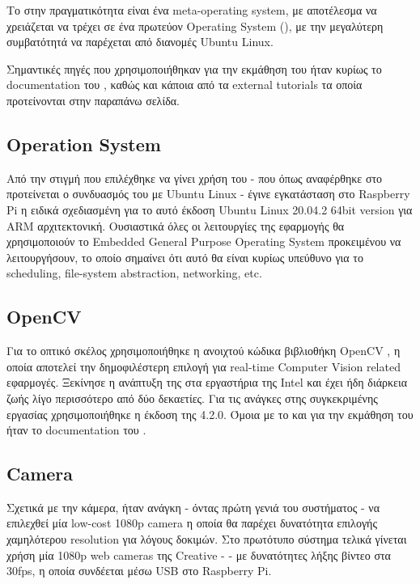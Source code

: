 Το  στην πραγματικότητα είναι ένα meta-operating system, με αποτέλεσμα να χρειάζεται να τρέχει σε ένα πρωτεύον Operating System (), με την μεγαλύτερη συμβατότητά να παρέχεται από διανομές Ubuntu Linux. 

Σημαντικές πηγές που χρησιμοποιήθηκαν για την εκμάθηση του  ήταν κυρίως το documentation του \cite{ros-doc}, καθώς και κάποια από τα external tutorials τα οποία προτείνονται στην παραπάνω σελίδα.

\subsection{Operation System}
Από την στιγμή που επιλέχθηκε να γίνει χρήση του  - που όπως αναφέρθηκε στο  προτείνεται ο συνδυασμός του με Ubuntu Linux - έγινε εγκατάσταση στο Raspberry Pi η ειδικά σχεδιασμένη για το αυτό έκδοση Ubuntu Linux 20.04.2 64bit version για ΑRM \cite{ubuntu-raspberry} αρχιτεκτονική. Ουσιαστικά όλες οι λειτουργίες της εφαρμογής θα χρησιμοποιούν το Embedded General Purpose Operating System προκειμένου να λειτουργήσουν, το οποίο σημαίνει ότι αυτό θα είναι κυρίως υπεύθυνο για το scheduling, file-system abstraction, networking, etc. 

\subsection{OpenCV}
Για το οπτικό σκέλος χρησιμοποιήθηκε η ανοιχτού κώδικα βιβλιοθήκη OpenCV \cite{opencv}, η οποία αποτελεί την δημοφιλέστερη επιλογή για real-time Computer Vision related εφαρμογές. Ξεκίνησε η ανάπτυξη της στα εργαστήρια της Intel και έχει ήδη διάρκεια ζωής λίγο περισσότερο από δύο δεκαετίες. Για τις ανάγκες στης συγκεκριμένης εργασίας χρησιμοποιήθηκε η έκδοση της 4.2.0. Όμοια με το  και για την εκμάθηση του  ήταν το documentation του .

\subsection{Camera}
Σχετικά με την κάμερα, ήταν ανάγκη - όντας πρώτη γενιά του συστήματος -  να επιλεχθεί μία low-cost 1080p camera η οποία θα παρέχει δυνατότητα επιλογής χαμηλότερου resolution για λόγους δοκιμών. Στο πρωτότυπο σύστημα τελικά γίνεται χρήση μία 1080p web cameras της Creative \cite{creative-camera} -  - με δυνατότητες λήξης βίντεο στα 30fps, η οποία συνδέεται μέσω USB στο Raspberry Pi.

